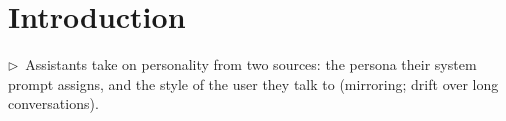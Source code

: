 \documentclass[11pt]{article}
\newcommand{\flow}[1]{\par\noindent\textcolor{blue!60!black}{\small$\triangleright$\ #1}\par\medskip}
\begin{document}
\section{Introduction}

\flow{Assistants take on personality from two sources: the persona their system prompt assigns, and the style of the user they talk to (mirroring; drift over long conversations).}
\end{document}
